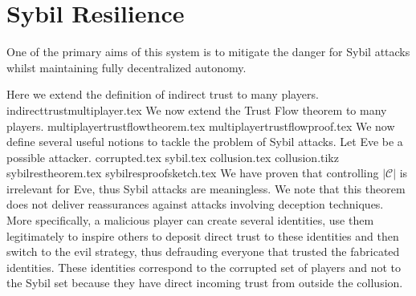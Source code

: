 \section{Sybil Resilience}
  One of the primary aims of this system is to mitigate the danger for Sybil attacks \cite{sybilattack} whilst maintaining
  fully decentralized autonomy.

  Here we extend the definition of indirect trust to many players.
  {indirecttrustmultiplayer.tex}
  \noindent We now extend the Trust Flow theorem to many players.
  {multiplayertrustflowtheorem.tex}
  {multiplayertrustflowproof.tex}
  \noindent We now define several useful notions to tackle the problem of Sybil attacks. Let Eve be a possible attacker.
  {corrupted.tex}
  {sybil.tex}
  {collusion.tex}
  {collusion.tikz}
  {sybilrestheorem.tex}
  {sybilresproofsketch.tex}
  We have proven that controlling $|\mathcal{C}|$ is irrelevant for Eve, thus Sybil attacks are meaningless. We note that
  this theorem does not deliver reassurances against attacks involving deception techniques. More specifically, a malicious
  player can create several identities, use them legitimately to inspire others to deposit direct trust to these identities
  and then switch to the evil strategy, thus defrauding everyone that trusted the fabricated identities. These identities
  correspond to the corrupted set of players and not to the Sybil set because they have direct incoming trust from outside
  the collusion.

